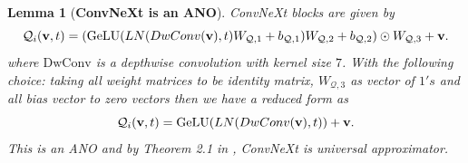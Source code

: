 \documentclass[reqno,10pt]{amsart}
\theoremstyle{plain}
\newtheorem{lem}{Lemma}
\theoremstyle{definition}
\newcommand{\cal}[1]{\mathcal{#1}}
\begin{document}
\begin{lem}[{\bf ConvNeXt is an ANO}] \label{lem:convnext}
    ConvNeXt blocks are given by
    \begin{equation}
        \cal Q_i({\bf v},t) = (\text{GeLU}(LN(DwConv({\bf v}),t)W_{\cal Q,1}+b_{\cal Q,1})W_{\cal Q,2} + b_{\cal Q,2}) \odot W_{\cal Q,3} + {\bf v}.
    \end{equation}
    where $\text{DwConv}$ is a depthwise convolution with kernel size $7$. With the following choice: taking all weight matrices to be identity matrix, $W_{\cal Q, 3}$ as vector of $1's$ and all bias vector to zero vectors then we have a reduced form as
    \begin{equation}
        \cal Q_i({\bf v},t) = \text{GeLU}(LN(DwConv({\bf v}),t)) + {\bf v}.
    \end{equation}
    This is an ANO and by Theorem 2.1 in \cite{SL2024}, ConvNeXt is universal approximator.
\end{lem}
\end{document}

